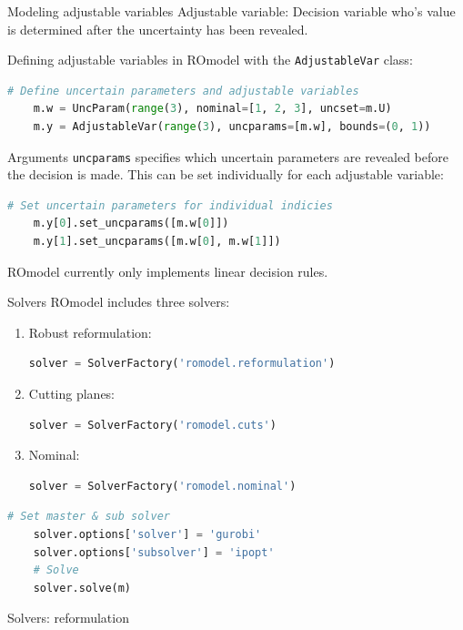 \documentclass[slides,aspectratio=169]{beamer}
\begin{document}
\begin{frame}[fragile]{Modeling adjustable variables}
    Adjustable variable: Decision variable who's value is determined after the
    uncertainty has been revealed.

    Defining adjustable variables in ROmodel with the \lstinline{AdjustableVar}
    class:
\begin{lstlisting}[language=Python]
    # Define uncertain parameters and adjustable variables
    m.w = UncParam(range(3), nominal=[1, 2, 3], uncset=m.U)
    m.y = AdjustableVar(range(3), uncparams=[m.w], bounds=(0, 1))
\end{lstlisting}
    Arguments \lstinline{uncparams} specifies which uncertain parameters are
    revealed before the decision is made. This can be set individually for each
    adjustable variable:
\begin{lstlisting}[language=Python]
    # Set uncertain parameters for individual indicies
    m.y[0].set_uncparams([m.w[0]])
    m.y[1].set_uncparams([m.w[0], m.w[1]])
\end{lstlisting}
    ROmodel currently only implements linear decision rules.
\end{frame}

\begin{frame}[fragile]{Solvers}
ROmodel includes three solvers:
\begin{enumerate}
    \item Robust reformulation:
\begin{lstlisting}[language=Python]
    solver = SolverFactory('romodel.reformulation')
\end{lstlisting}
    \item Cutting planes:
\begin{lstlisting}[language=Python]
    solver = SolverFactory('romodel.cuts')
\end{lstlisting}
    \item Nominal:
\begin{lstlisting}[language=Python]
    solver = SolverFactory('romodel.nominal')
\end{lstlisting}
\end{enumerate}
\begin{lstlisting}[language=Python]
    # Set master & sub solver
    solver.options['solver'] = 'gurobi'
    solver.options['subsolver'] = 'ipopt'
    # Solve
    solver.solve(m)
\end{lstlisting}
\end{frame}

\begin{frame}{Solvers: reformulation}
    \centering
    
\end{frame}
\end{document}
